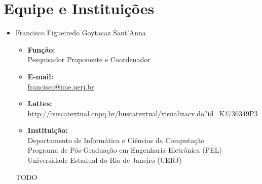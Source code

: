 \documentclass[titlepage,12pt]{article}
\begin{document}
\section{Equipe e Instituições}

\begin{itemize}
    \item Francisco Figueiredo Goytacaz Sant'Anna
    \begin{itemize}
        \item \textbf{Função:} \\
              Pesquisador Proponente e Coordenador
        \item \textbf{E-mail:} \\
              \url{francisco@ime.uerj.br}
        \item \textbf{Lattes:} \\
              {\scriptsize{\url{http://buscatextual.cnpq.br/buscatextual/visualizacv.do?id=K4736349P3}}}
        \item \textbf{Instituição:}                                     \\
              Departamento de Informática e Ciências da Computação      \\
              Programa de Pós-Graduação em Engenharia Eletrônica (PEL)  \\
              Universidade Estadual do Rio de Janeiro (UERJ)
    \end{itemize}

    TODO

\end{itemize}
\end{document}
